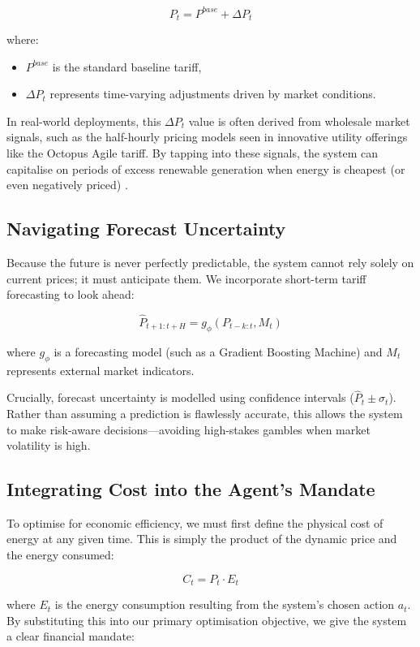 \documentclass[11pt,a4paper]{article}
\begin{document}
$$P_t=P^{base}+\Delta P_t$$

where:
\begin{itemize}
    \item $P^{base}$ is the standard baseline tariff,
    \item $\Delta P_t$ represents time-varying adjustments driven by market conditions.
\end{itemize}

In real-world deployments, this $\Delta P_t$ value is often derived from wholesale market signals, such as the half-hourly pricing models seen in innovative utility offerings like the Octopus Agile tariff. By tapping into these signals, the system can capitalise on periods of excess renewable generation when energy is cheapest (or even negatively priced) \cite{mohsenian2010autonomous}.

\subsection{Navigating Forecast Uncertainty}

Because the future is never perfectly predictable, the system cannot rely solely on current prices; it must anticipate them. We incorporate short-term tariff forecasting to look ahead:

$$\hat{P}_{t+1:t+H}=g_{\phi}(P_{t-k:t}, M_t)$$

where $g_{\phi}$ is a forecasting model (such as a Gradient Boosting Machine) and $M_t$ represents external market indicators.

Crucially, forecast uncertainty is modelled using confidence intervals ($\hat{P}_t\pm\sigma_t$). Rather than assuming a prediction is flawlessly accurate, this allows the system to make risk-aware decisions---avoiding high-stakes gambles when market volatility is high.

\subsection{Integrating Cost into the Agent's Mandate}

To optimise for economic efficiency, we must first define the physical cost of energy at any given time. This is simply the product of the dynamic price and the energy consumed:

$$C_t=P_t \cdot E_t$$

where $E_t$ is the energy consumption resulting from the system's chosen action $a_t$. By substituting this into our primary optimisation objective, we give the system a clear financial mandate:
\end{document}

